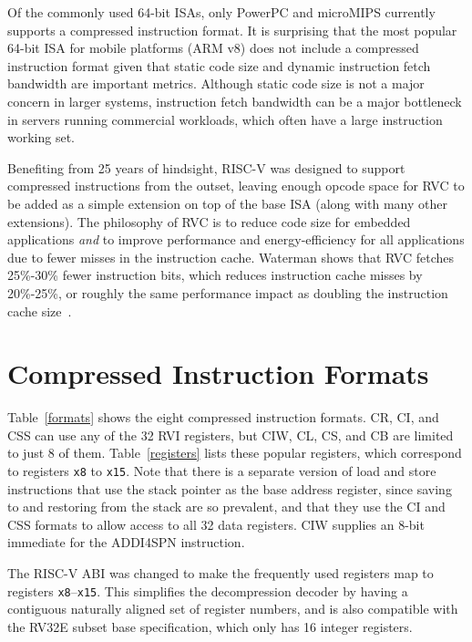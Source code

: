 \begin{commentary}
Of the commonly used 64-bit ISAs, only PowerPC and microMIPS currently
supports a compressed instruction format.  It is surprising that the
most popular 64-bit ISA for mobile platforms (ARM v8) does not include
a compressed instruction format given that static code size and
dynamic instruction fetch bandwidth are important metrics.  Although
static code size is not a major concern in larger systems, instruction
fetch bandwidth can be a major bottleneck in servers running
commercial workloads, which often have a large instruction working
set.

Benefiting from 25 years of hindsight, RISC-V was designed to support
compressed instructions from the outset, leaving enough opcode
space for RVC to be added as a simple extension on top of the base ISA
(along with many other extensions).  The philosophy of RVC is to
reduce code size for embedded applications \emph{and} to improve
performance and energy-efficiency for all applications due to fewer
misses in the instruction cache. Waterman shows that RVC fetches
25\%-30\% fewer instruction bits, which reduces instruction cache
misses by 20\%-25\%, or roughly the same performance impact as
doubling the instruction cache size~\cite{waterman-ms}.
\end{commentary}


\section{Compressed Instruction Formats}

Table~\ref{formats} shows the eight compressed instruction
formats. CR, CI, and CSS can use any of the 32 RVI registers, but CIW,
CL, CS, and CB are limited to just 8 of them. Table~\ref{registers}
lists these popular registers, which correspond to registers {\tt x8}
to {\tt x15}.  Note that there is a
separate version of load and store instructions that use the stack
pointer as the base address register, since saving to and restoring
from the stack are so prevalent, and that they use the CI and CSS
formats to allow access to all 32 data registers. CIW supplies an
8-bit immediate for the ADDI4SPN instruction.

\begin{commentary}
The RISC-V ABI was changed to make the frequently used registers map
to registers {\tt x8}--{\tt x15}.  This simplifies the decompression
decoder by having a contiguous naturally aligned set of register
numbers, and is also compatible with the RV32E subset base
specification, which only has 16 integer registers.
\end{commentary}

